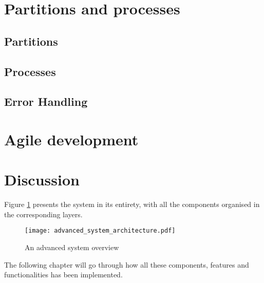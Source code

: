 \section{Partitions and processes}

\subsection{Partitions}

\subsection{Processes}

\subsection{Error Handling}

\section{Agile development}

\section{Discussion}

Figure \ref{fig:advanced_system} presents the system in its entirety,
with all the components organised in the corresponding layers.


\begin{figure}[H]
\centering
\texttt{[image: advanced\_system\_architecture.pdf]}

\caption{An advanced system overview}
\label{fig:advanced_system}
\end{figure}

The following chapter will go through how all these components,
features and functionalities has been implemented.

